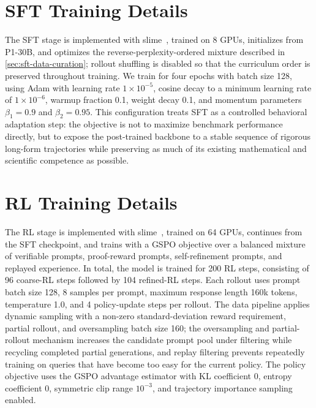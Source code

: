 \section{SFT Training Details}
\label{app:sft-training-details}

The SFT stage is implemented with slime~\citep{thudm2026slime}, trained on 8 GPUs, initializes from P1-30B, and optimizes the reverse-perplexity-ordered mixture described in \cref{sec:sft-data-curation}; rollout shuffling is disabled so that the curriculum order is preserved throughout training. We train for four epochs with batch size 128, using Adam with learning rate $1\times 10^{-5}$, cosine decay to a minimum learning rate of $1\times 10^{-6}$, warmup fraction 0.1, weight decay 0.1, and momentum parameters $\beta_1=0.9$ and $\beta_2=0.95$. This configuration treats SFT as a controlled behavioral adaptation step: the objective is not to maximize benchmark performance directly, but to expose the post-trained backbone to a stable sequence of rigorous long-form trajectories while preserving as much of its existing mathematical and scientific competence as possible.

\section{RL Training Details}
\label{app:rl-training-details}

The RL stage is implemented with slime~\citep{thudm2026slime}, trained on 64 GPUs, continues from the SFT checkpoint, and trains with a GSPO objective over a balanced mixture of verifiable prompts, proof-reward prompts, self-refinement prompts, and replayed experience. In total, the model is trained for 200 RL steps, consisting of 96 coarse-RL steps followed by 104 refined-RL steps. Each rollout uses prompt batch size 128, 8 samples per prompt, maximum response length 160k tokens, temperature 1.0, and 4 policy-update steps per rollout. The data pipeline applies dynamic sampling with a non-zero standard-deviation reward requirement, partial rollout, and oversampling batch size 160; the oversampling and partial-rollout mechanism increases the candidate prompt pool under filtering while recycling completed partial generations, and replay filtering prevents repeatedly training on queries that have become too easy for the current policy. The policy objective uses the GSPO advantage estimator with KL coefficient 0, entropy coefficient 0, symmetric clip range $10^{-3}$, and trajectory importance sampling enabled. 

